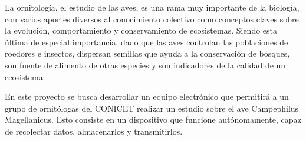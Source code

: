 La ornitología, el estudio de las aves, es una rama muy importante de la biología, con varios aportes diversos al conocimiento colectivo como conceptos claves sobre la evolución, comportamiento y conservamiento de ecosistemas. Siendo esta última de especial importancia, dado que las aves controlan las poblaciones de roedores e insectos, dispersan semillas que ayuda a la conservación de bosques, son fuente de alimento de otras especies y son indicadores de la calidad de un ecosistema.


En este proyecto se busca desarrollar un equipo electrónico que permitirá a un grupo de ornitólogas del CONICET realizar un estudio sobre el ave Campephilus Magellanicus. Esto consiste en un dispositivo que funcione autónomamente, capaz de recolectar datos, almacenarlos y transmitirlos.